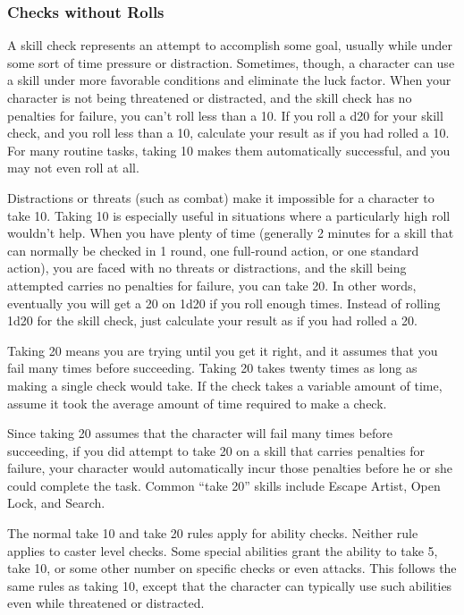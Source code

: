  \subsubsection{Checks without Rolls}
A skill check represents an attempt to accomplish some goal, usually while under some sort of time pressure or distraction. Sometimes, though, a character can use a skill under more favorable conditions and eliminate the luck factor.
  When your character is not being threatened or distracted,
and the skill check has no penalties for failure, you can't roll less than a 10. If you roll a d20 for your skill check, and you roll less than a 10, calculate your result as if you had rolled a 10. For many routine tasks, taking 10 makes them automatically successful, and you may not even roll at all.

Distractions or threats (such as combat) make it impossible for a character to take 10. Taking 10 is especially useful in situations where a particularly high roll wouldn't help.
 When you have plenty of time (generally 2 minutes for a skill that can normally be checked in 1 round, one full-round action, or one standard action), you are faced with no threats or distractions, and the skill being attempted carries no penalties for failure, you can take 20. In other words, eventually you will get a 20 on 1d20 if you roll enough times. Instead of rolling 1d20 for the skill check, just calculate your result as if you had rolled a 20.

Taking 20 means you are trying until you get it right, and it assumes that you fail many times before succeeding. Taking 20 takes twenty times as long as making a single check would take. If the check takes a variable amount of time, assume it took the average amount of time required to make a check.

Since taking 20 assumes that the character will fail many times before succeeding, if you did attempt to take 20 on a skill that carries penalties for failure, your character would automatically incur those penalties before he or she could complete the task. Common ``take 20'' skills include Escape Artist, Open Lock, and Search.

 The normal take 10 and take 20 rules apply for ability checks. Neither rule applies to caster level checks.
 Some special abilities grant the ability to take 5, take 10, or some other number on specific checks or even attacks. This follows the same rules as taking 10, except that the character can typically use such abilities even while threatened or distracted.

